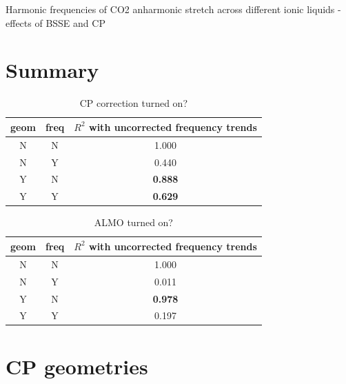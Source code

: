 \documentclass{article}
\begin{document}
Harmonic frequencies of CO2 anharmonic stretch across different ionic liquids - effects of BSSE and CP

\section{Summary}

\begin{table}
  \centering
  \caption{CP correction turned on?}
  \begin{tabular}{ccc}
    \toprule
    geom & freq & {\(R^2\) with uncorrected frequency trends} \\
    \midrule
    N & N & 1.000 \\
    N & Y & 0.440 \\
    Y & N & \textbf{0.888} \\
    Y & Y & \textbf{0.629} \\
    \bottomrule
  \end{tabular}
\end{table}

\begin{table}
  \centering
  \caption{ALMO turned on?}
  \begin{tabular}{ccc}
    \toprule
    geom & freq & {\(R^2\) with uncorrected frequency trends} \\
    \midrule
    N & N & 1.000 \\
    N & Y & 0.011 \\
    Y & N & \textbf{0.978} \\
    Y & Y & 0.197 \\
    \bottomrule
  \end{tabular}
\end{table}

\section{CP geometries}
\end{document}
